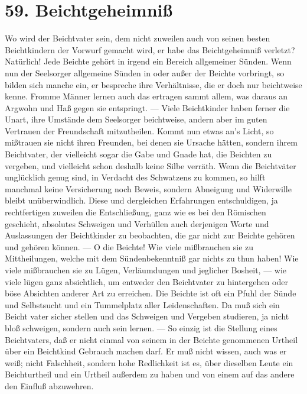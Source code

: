 \section{59. Beichtgeheimniß}

Wo wird der Beichtvater sein, dem nicht zuweilen auch von seinen besten Beichtkindern der Vorwurf gemacht wird, er habe das Beichtgeheimniß verletzt? Natürlich! Jede Beichte
gehört in irgend ein Bereich allgemeiner Sünden. Wenn nun der Seelsorger allgemeine Sünden in oder außer der Beichte vorbringt, so bilden sich manche ein, er bespreche ihre Verhältnisse, die er doch nur beichtweise kenne. Fromme Männer lernen auch das ertragen sammt allem, was daraus an Argwohn und Haß gegen sie entspringt. — Viele Beichtkinder haben ferner die Unart, ihre Umstände dem Seelsorger beichtweise, andern aber im guten Vertrauen der Freundschaft mitzutheilen. Kommt nun etwas an’s Licht, so mißtrauen sie nicht ihren Freunden, bei denen sie Ursache hätten, sondern ihrem Beichtvater, der vielleicht sogar die Gabe und Gnade hat, die Beichten zu vergeben, und vielleicht schon deshalb keine Silbe verräth. Wenn die Beichtväter unglücklich genug sind, in Verdacht des Schwatzens zu kommen, so hilft manchmal keine Versicherung noch Beweis, sondern Abneigung und Widerwille bleibt unüberwindlich. Diese und dergleichen Erfahrungen entschuldigen, ja rechtfertigen zuweilen die Entschließung, ganz wie es bei den Römischen geschieht, absolutes Schweigen und Verhüllen auch derjenigen Worte und Auslassungen der Beichtkinder zu beobachten, die gar nicht zur Beichte gehören und gehören können. — O die Beichte! Wie viele mißbrauchen sie zu Mittheilungen, welche mit dem Sündenbekenntniß gar nichts zu thun haben! Wie viele mißbrauchen sie zu Lügen, Verläumdungen und jeglicher Bosheit, — wie viele lügen ganz absichtlich, um entweder den Beichtvater zu hintergehen oder böse Absichten anderer Art zu erreichen. Die Beichte ist oft ein Pfuhl der Sünde und Selbstsucht und ein Tummelplatz aller Leidenschaften. Da muß sich ein Beicht%
vater sicher stellen und das Schweigen und Vergeben studieren, ja nicht bloß schweigen, sondern auch sein lernen. — So einzig ist die Stellung eines Beichtvaters, daß er nicht einmal von seinem in der Beichte genommenen Urtheil über ein Beichtkind Gebrauch machen darf. Er muß nicht wissen, auch was er weiß; nicht Falschheit, sondern hohe Redlichkeit ist es, über dieselben Leute ein Beichturtheil und ein Urtheil außerdem zu haben und von einem auf das andere den Einfluß abzuwehren.

